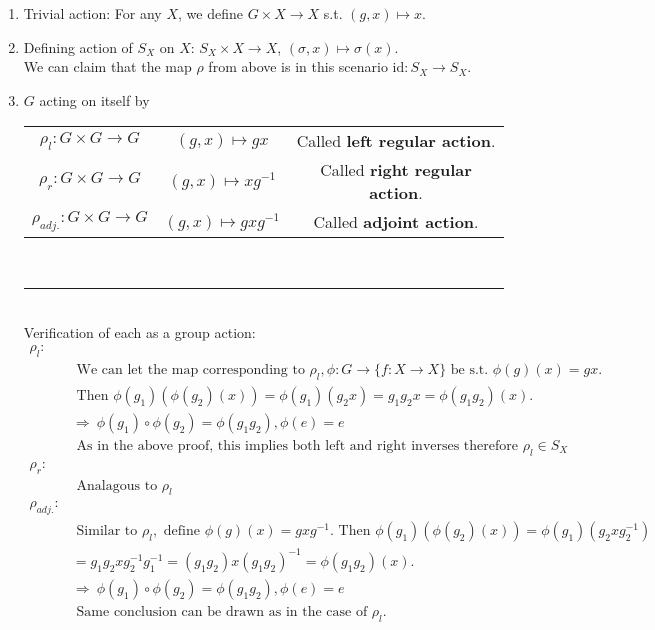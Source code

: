 \documentclass{article}
\begin{document}
\begin{enumerate}
\item Trivial action: For any $X$, we define $G\times X\rightarrow X$ s.t. $(g,x)\mapsto x$.
\item Defining action of $S_X$ on $X$: $S_X\times X\rightarrow X$, $(\sigma,x)\mapsto\sigma(x)$.\\ We can claim that the map $\rho$ from above is in this scenario $\mathrm{id}:S_X\rightarrow S_X$.
\item $G$ acting on itself by \\
\begin{tabular}{ccc}
$\rho_l : G\times G\rightarrow G$&$(g,x)\mapsto gx$& Called \textbf{left regular action}.\\
$\rho_r:G\times G\rightarrow G$&$(g,x)\mapsto xg^{-1}$& Called \textbf{right regular action}.\\
$\rho_{adj.}:G\times G\rightarrow G$&$(g,x)\mapsto gxg^{-1}$& Called \textbf{adjoint action}.
\end{tabular}
\vspace{2mm}~\\
\hrule
\vspace{2mm}~\\
Verification of each as a group action:
\begin{align*}
\rho_l:& \\
		&\text{ We can let the map corresponding to }\rho_l,\phi:G\rightarrow\lbrace f:X\rightarrow X\rbrace \text{ be s.t. }\phi(g)(x)=gx.\\
		&\text{ Then } \phi(g_1)(\phi(g_2)(x))=\phi(g_1)(g_2x)=g_1g_2x=\phi(g_1g_2)(x).\\
		&\Rightarrow ~\phi(g_1)\circ\phi(g_2)=\phi(g_1g_2), \phi(e)=e\\
		&\text{ As in the above proof, this implies both left and right inverses therefore }\rho_l\in S_X\\
\rho_r:&\\
		&\text{ Analagous to }\rho_l\\
\rho_{adj.}:&\\
		& \text{ Similar to }\rho_l, \text{ define } \phi(g)(x)=gxg^{-1}. \text{ Then } \phi(g_1)(\phi(g_2)(x))=\phi(g_1)(g_2xg_2^{-1})\\&=g_1g_2xg_2^{-1}g_1^{-1}=(g_1g_2)x(g_1g_2)^{-1}=\phi(g_1g_2)(x).\\
		&\Rightarrow ~\phi(g_1)\circ\phi(g_2)=\phi(g_1g_2), \phi(e)=e\\
		& \text{ Same conclusion can be drawn as in the case of } \rho_l.
\end{align*}

\end{enumerate}
\end{document}

